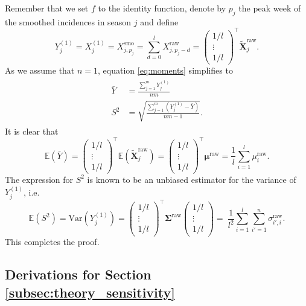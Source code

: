 \documentclass[12pt]{article}
\begin{document}
Remember that we set $f$ to the identity function, denote by $p_j$ the peak week of the smoothed incidences in season $j$ and define
$$
Y_j^{(1)} = X_j^{(1)} = X^\text{smo}_{j, p_j} = \sum_{d = 0}^l X^\text{raw}_{j, p_j - d} = \begin{pmatrix} 1/l \\ \vdots \\ 1/l \end{pmatrix}^\top \tilde{\mathbf{X}}^{\text{raw}}_j.
$$
As we assume that $n = 1$, equation \eqref{eq:moments} simplifies to
\begin{align}
\begin{split}
\bar{Y} & = \frac{\sum_{j = 1}^m Y_j^{(1)}}{nm}\\
S^2 & = \sqrt{ \frac{\sum_{j = 1}^m (Y_j^{(1)}  - \bar{Y})}{nm - 1}}.
\end{split}
\end{align}
It is clear that
$$
\mathbb{E}(\bar{Y}) = \begin{pmatrix} 1/l \\ \vdots \\ 1/l \end{pmatrix}^\top \mathbb{E}(\tilde{\mathbf{X}}^{\text{raw}}_j) = \begin{pmatrix} 1/l \\ \vdots \\ 1/l \end{pmatrix}^\top \boldsymbol{\mu}^\text{raw} = \frac{1}{l}\sum_{i = 1}^l \mu^\text{raw}_i.
$$
The expression for $S^2$ is known to be an unbiased estimator for the variance of $Y_j^{(1)}$, i.e.
$$
\mathbb{E}(S^2) = \text{Var}(Y_j^{(1)}) = \begin{pmatrix} 1/l \\ \vdots \\ 1/l \end{pmatrix}^\top \mathbf{\Sigma}^\text{raw} \begin{pmatrix} 1/l \\ \vdots \\ 1/l \end{pmatrix} = \ \frac{1}{l^2} \sum_{i = 1}^l \sum_{i' = 1}^n \sigma^\text{raw}_{i', i}.
$$
This completes the proof.

\subsection{Derivations for Section \ref{subsec:theory_sensitivity}}
\label{suppl:derivations_sensitivity}
\end{document}
